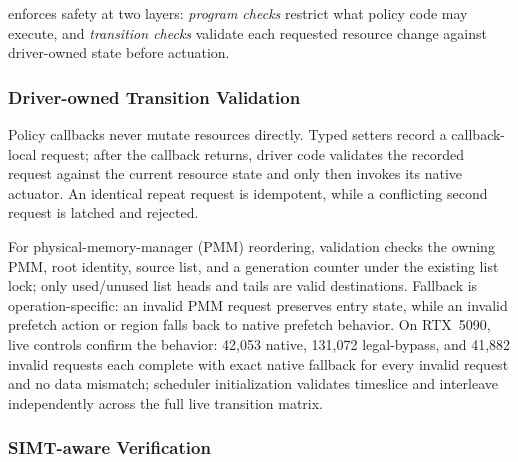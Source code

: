 \sys{} enforces safety at two layers: \emph{program checks} restrict what policy code may execute, and \emph{transition checks} validate each requested resource change against driver-owned state before actuation.

\subsubsection{Driver-owned Transition Validation}

Policy callbacks never mutate resources directly.
Typed setters record a callback-local request; after the callback returns, driver code validates the recorded request against the current resource state and only then invokes its native actuator.
An identical repeat request is idempotent, while a conflicting second request is latched and rejected.

For physical-memory-manager (PMM) reordering, validation checks the owning PMM, root identity, source list, and a generation counter under the existing list lock; only used/unused list heads and tails are valid destinations.
Fallback is operation-specific: an invalid PMM request preserves entry state, while an invalid prefetch action or region falls back to native prefetch behavior.
On RTX~5090, live controls confirm the behavior: 42{,}053 native, 131{,}072 legal-bypass, and 41{,}882 invalid requests each complete with exact native fallback for every invalid request and no data mismatch; scheduler initialization validates timeslice and interleave independently across the full live transition matrix.

\subsubsection{SIMT-aware Verification}

